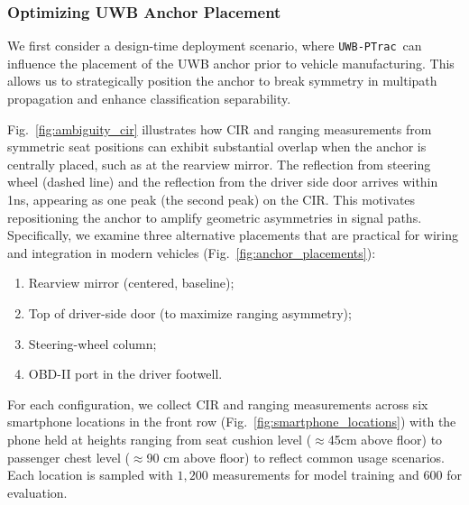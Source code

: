 \documentclass[sigconf]{acmart}
\newcommand{\name}{{{\tt UWB-PTrac}}}
\begin{document}
\subsubsection{Optimizing UWB Anchor Placement}
%
We first consider a design-time deployment scenario, where \name~can influence
the placement of the UWB anchor prior to vehicle manufacturing.
%
This allows us to strategically position the anchor to break symmetry in 
multipath propagation and enhance classification separability.

Fig.~\ref{fig:ambiguity_cir} illustrates how CIR and ranging measurements from 
symmetric seat positions can exhibit substantial overlap when the anchor is 
centrally placed, such as at the rearview mirror. The reflection from steering 
wheel (dashed line) and the reflection from the driver side door arrives 
within 1ns, appearing as one peak (the second peak) on the CIR. 
%
This motivates repositioning the anchor to amplify geometric asymmetries in 
signal paths.
%
Specifically, we examine three alternative placements that are practical for 
wiring and integration in modern vehicles (Fig.~\ref{fig:anchor_placements}):

\begin{enumerate}
\item Rearview mirror (centered, baseline);
\item Top of driver-side door (to maximize ranging asymmetry);
\item Steering-wheel column;
\item OBD-II port in the driver footwell.
\end{enumerate}


For each configuration, we collect CIR and ranging measurements across six 
smartphone locations in the front row (Fig.~\ref{fig:smartphone_locations}) 
with the phone held at heights ranging from seat cushion level ($\approx$45cm 
above floor) to passenger chest level ($\approx$90 cm above floor) to reflect 
common usage scenarios.
Each location is sampled with $1,200$ measurements for model training and
$600$ for evaluation. 




\end{document}
